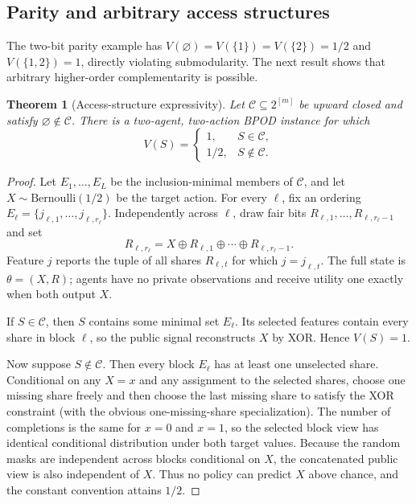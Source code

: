 \documentclass[11pt]{article}
\newtheorem{theorem}{Theorem}
\newcommand{\calC}{\mathcal{C}}
\begin{document}
\subsection{Parity and arbitrary access structures}
The two-bit parity example has $V(\varnothing)=V(\{1\})=V(\{2\})=1/2$ and $V(\{1,2\})=1$, directly violating submodularity. The next result shows that arbitrary higher-order complementarity is possible.

\begin{theorem}[Access-structure expressivity]\label{thm:access-supp}
Let $\calC\subseteq 2^{[m]}$ be upward closed and satisfy $\varnothing\notin\calC$. There is a two-agent, two-action BPOD instance for which
\[
V(S)=\begin{cases}1,&S\in\calC,\\[2pt]1/2,&S\notin\calC.\end{cases}
\]
\end{theorem}
\begin{proof}
Let $E_1,\ldots,E_L$ be the inclusion-minimal members of $\calC$, and let $X\sim\mathrm{Bernoulli}(1/2)$ be the target action. For every $\ell$, fix an ordering $E_\ell=\{j_{\ell,1},\ldots,j_{\ell,r_\ell}\}$. Independently across $\ell$, draw fair bits $R_{\ell,1},\ldots,R_{\ell,r_\ell-1}$ and set
\[
R_{\ell,r_\ell}=X\oplus R_{\ell,1}\oplus\cdots\oplus R_{\ell,r_\ell-1}.
\]
Feature $j$ reports the tuple of all shares $R_{\ell,t}$ for which $j=j_{\ell,t}$. The full state is $\theta=(X,R)$; agents have no private observations and receive utility one exactly when both output $X$.

If $S\in\calC$, then $S$ contains some minimal set $E_\ell$. Its selected features contain every share in block $\ell$, so the public signal reconstructs $X$ by XOR. Hence $V(S)=1$.

Now suppose $S\notin\calC$. Then every block $E_\ell$ has at least one unselected share. Conditional on any $X=x$ and any assignment to the selected shares, choose one missing share freely and then choose the last missing share to satisfy the XOR constraint (with the obvious one-missing-share specialization). The number of completions is the same for $x=0$ and $x=1$, so the selected block view has identical conditional distribution under both target values. Because the random masks are independent across blocks conditional on $X$, the concatenated public view is also independent of $X$. Thus no policy can predict $X$ above chance, and the constant convention attains $1/2$.
\end{proof}
\end{document}
